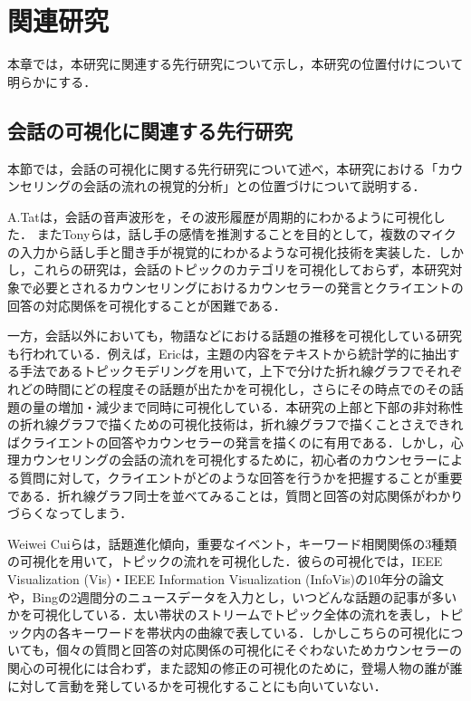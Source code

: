 \documentclass[shuuron]{kuee}
\begin{document}
\chapter{関連研究}%






本章では，本研究に関連する先行研究について示し，本研究の位置付けについて明らかにする．%

\section{会話の可視化に関連する先行研究}

本節では，会話の可視化に関する先行研究について述べ，本研究における「カウンセリングの会話の流れの視覚的分析」との位置づけについて説明する．%

A.Tat\cite{tat2002visualising}は，会話の音声波形を，その波形履歴が周期的にわかるように可視化した．
またTonyら\cite{bergstrom2007seeing}は，話し手の感情を推測することを目的として，複数のマイクの入力から話し手と聞き手が視覚的にわかるような可視化技術を実装した．しかし，これらの研究は，会話のトピックのカテゴリを可視化しておらず，本研究対象で必要とされるカウンセリングにおけるカウンセラーの発言とクライエントの回答の対応関係を可視化することが困難である．


一方，会話以外においても，物語などにおける話題の推移を可視化している研究も行われている．例えば，Eric\cite{taskdriven}は，主題の内容をテキストから統計学的に抽出する手法であるトピックモデリングを用いて，上下で分けた折れ線グラフでそれぞれどの時間にどの程度その話題が出たかを可視化し，さらにその時点でのその話題の量の増加・減少まで同時に可視化している．本研究の上部と下部の非対称性の折れ線グラフで描くための可視化技術は，折れ線グラフで描くことさえできればクライエントの回答やカウンセラーの発言を描くのに有用である．しかし，心理カウンセリングの会話の流れを可視化するために，初心者のカウンセラーによる質問に対して，クライエントがどのような回答を行うかを把握することが重要である．折れ線グラフ同士を並べてみることは，質問と回答の対応関係がわかりづらくなってしまう．

Weiwei Cuiら\cite{cui2011textflow}は，話題進化傾向，重要なイベント，キーワード相関関係の3種類の可視化を用いて，トピックの流れを可視化した．彼らの可視化では，IEEE Visualization (Vis)・IEEE Information Visualization (InfoVis)の10年分の論文や，Bingの2週間分のニュースデータを入力とし，いつどんな話題の記事が多いかを可視化している．太い帯状のストリームでトピック全体の流れを表し，トピック内の各キーワードを帯状内の曲線で表している．しかしこちらの可視化についても，個々の質問と回答の対応関係の可視化にそぐわないためカウンセラーの関心の可視化には合わず，また認知の修正の可視化のために，登場人物の誰が誰に対して言動を発しているかを可視化することにも向いていない．
\end{document}
